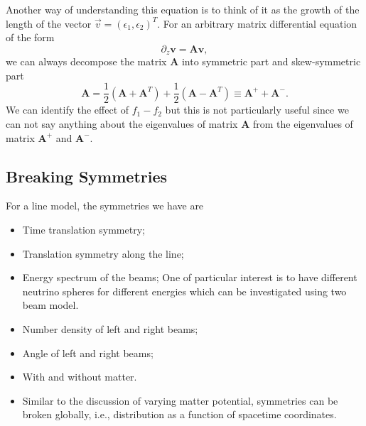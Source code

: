 




Another way of understanding this equation is to think of it as the growth of the length of the vector $\vec v = (\epsilon_1,\epsilon_2)^T$. For an arbitrary matrix differential equation of the form
\begin{equation*}
  \partial_z \mathbf v = \mathbf A \mathbf v,  
\end{equation*}
we can always decompose the matrix $\mathbf A$ into symmetric part and skew-symmetric part
\begin{equation*}
  \mathbf A = \frac{1}{2}(\mathbf A + \mathbf A^T) + \frac{1}{2}(\mathbf A - \mathbf A^T) \equiv \mathbf A^+ + \mathbf A^-.
\end{equation*}
We can identify the effect of $f_1-f_2$ but this is not particularly useful since we can not say anything about the eigenvalues of matrix $\mathbf A$ from the eigenvalues of matrix $\mathbf A^+$ and $\mathbf A^-$.



\subsection{Breaking Symmetries}



For a line model, the symmetries we have are
\begin{itemize}
    \item Time translation symmetry;
\item Translation symmetry along the line;
\item Energy spectrum of the beams; One of particular interest is to have different neutrino spheres for different energies which can be investigated using two beam model.
\item Number density of left and right beams;
\item Angle of left and right beams;
\item With and without matter.
\item Similar to the discussion of varying matter potential, symmetries can be broken globally, i.e., distribution as a function of spacetime coordinates.
\end{itemize}

